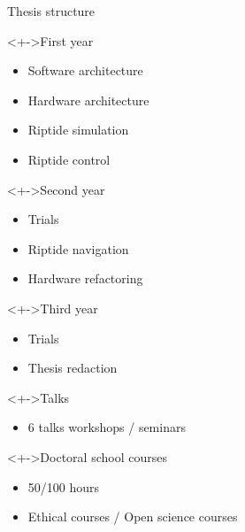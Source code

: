 \documentclass[10pt, xcolor={usenames, dvipsnames}]{beamer}
\begin{document}
        \begin{frame}{Thesis structure}
            \begin{minipage}[c]{.48\textwidth}
                \begin{block}<+->{First year}
                    \vspace{2.5mm}
                    \begin{itemize}
                        \item Software architecture
                        \item Hardware architecture
                        \item Riptide simulation
                        \item Riptide control
                    \end{itemize}
                \end{block}
                \begin{block}<+->{Second year}
                    \begin{itemize}
                        \item Trials
                        \item Riptide navigation
                        \item Hardware refactoring
                    \end{itemize}
                \end{block}
            \end{minipage}
            \hfill
            \begin{minipage}[c]{.48\textwidth}
                \begin{block}<+->{Third year}
                    \vspace{2.5mm}
                    \begin{itemize}
                        \item Trials
                        \item Thesis redaction
                    \end{itemize}
                \end{block}
                \begin{block}<+->{Talks}
                    \begin{itemize}
                        \item 6 talks workshops / seminars
                    \end{itemize}
                \end{block}
                \begin{block}<+->{Doctoral school courses}
                    \begin{itemize}
                        \item 50/100 hours
                        \item Ethical courses / Open science courses
                    \end{itemize}
                \end{block}
            \end{minipage}
        \end{frame}
\end{document}
